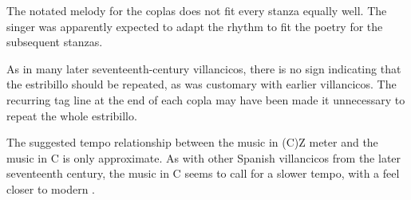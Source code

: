 

The notated melody for the coplas does not fit every stanza equally well.
The singer was apparently expected to adapt the rhythm to fit the poetry for the subsequent stanzas.

As in many later seventeenth-century villancicos, there is no sign indicating that the estribillo should be repeated, as was customary with earlier villancicos.
The recurring tag line at the end of each copla may have been made it unnecessary to repeat the whole estribillo.

The suggested tempo relationship between the music in (C)Z meter and the music in C is only approximate. 
As with other Spanish villancicos from the later seventeenth century, the music in C seems to call for a slower tempo, with a feel closer to modern .